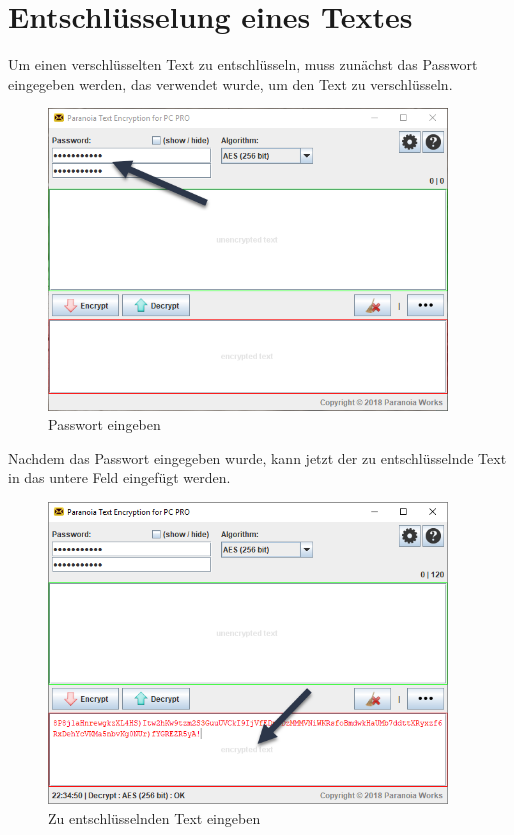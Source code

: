 \documentclass[12pt,a4paper]{scrreprt}
\begin{document}
\newpage

\section{Entschlüsselung eines Textes}
Um einen verschlüsselten Text zu entschlüsseln, muss zunächst das Passwort eingegeben werden, das verwendet wurde, um den Text zu verschlüsseln.

\begin{figure}[h]
\begin{center}
\includegraphics[width=300pt]{media/pte1.png}
\caption{Passwort eingeben}
\label{pte4}
\end{center}
\end{figure}

\noindent Nachdem das Passwort eingegeben wurde, kann jetzt der zu entschlüsselnde Text in das untere Feld eingefügt werden.

\begin{figure}[h]
\begin{center}
\includegraphics[width=300pt]{media/pte4.png}
\caption{Zu entschlüsselnden Text eingeben}
\label{pte5}
\end{center}
\end{figure}
\end{document}
